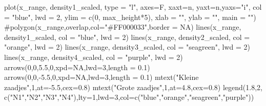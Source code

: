 \documentclass[
  a4paper,
]{scrbook}
\newenvironment{Shaded}{\begin{snugshade}}{\end{snugshade}}
\newcommand{\AttributeTok}[1]{\textcolor[rgb]{0.40,0.45,0.13}{#1}}
\newcommand{\CommentTok}[1]{\textcolor[rgb]{0.37,0.37,0.37}{#1}}
\newcommand{\ConstantTok}[1]{\textcolor[rgb]{0.56,0.35,0.01}{#1}}
\newcommand{\DecValTok}[1]{\textcolor[rgb]{0.68,0.00,0.00}{#1}}
\newcommand{\FloatTok}[1]{\textcolor[rgb]{0.68,0.00,0.00}{#1}}
\newcommand{\FunctionTok}[1]{\textcolor[rgb]{0.28,0.35,0.67}{#1}}
\newcommand{\NormalTok}[1]{\textcolor[rgb]{0.00,0.23,0.31}{#1}}
\newcommand{\SpecialCharTok}[1]{\textcolor[rgb]{0.37,0.37,0.37}{#1}}
\newcommand{\StringTok}[1]{\textcolor[rgb]{0.13,0.47,0.30}{#1}}
\theoremstyle{definition}
\theoremstyle{remark}
\begin{document}
\begin{Shaded}
\begin{Highlighting}[]
  \FunctionTok{plot}\NormalTok{(x\_range, density1\_scaled, }\AttributeTok{type =} \StringTok{"l"}\NormalTok{, }
       \AttributeTok{axes=}\NormalTok{F, }\AttributeTok{xaxt=}\StringTok{\textquotesingle{}n\textquotesingle{}}\NormalTok{, }\AttributeTok{yaxt=}\StringTok{\textquotesingle{}n\textquotesingle{}}\NormalTok{,}\AttributeTok{yaxs=}\StringTok{"i"}\NormalTok{,}
       \AttributeTok{col =} \StringTok{"blue"}\NormalTok{, }\AttributeTok{lwd =} \DecValTok{2}\NormalTok{, }\AttributeTok{ylim =} \FunctionTok{c}\NormalTok{(}\DecValTok{0}\NormalTok{, max\_height}\SpecialCharTok{*}\DecValTok{5}\NormalTok{), }
       \AttributeTok{xlab =} \StringTok{""}\NormalTok{, }\AttributeTok{ylab =} \StringTok{""}\NormalTok{, }\AttributeTok{main =} \StringTok{""}\NormalTok{)}
  \CommentTok{\#polygon(x\_range,overlap,col="\#FF000033",border = NA)}
  \FunctionTok{lines}\NormalTok{(x\_range, density1\_scaled, }\AttributeTok{col =} \StringTok{"blue"}\NormalTok{, }\AttributeTok{lwd =} \DecValTok{2}\NormalTok{)}
  \FunctionTok{lines}\NormalTok{(x\_range, density2\_scaled, }\AttributeTok{col =} \StringTok{"orange"}\NormalTok{, }\AttributeTok{lwd =} \DecValTok{2}\NormalTok{)}
  \FunctionTok{lines}\NormalTok{(x\_range, density3\_scaled, }\AttributeTok{col =} \StringTok{"seagreen"}\NormalTok{, }\AttributeTok{lwd =} \DecValTok{2}\NormalTok{)}
  \FunctionTok{lines}\NormalTok{(x\_range, density4\_scaled, }\AttributeTok{col =} \StringTok{"purple"}\NormalTok{, }\AttributeTok{lwd =} \DecValTok{2}\NormalTok{)}
  \FunctionTok{arrows}\NormalTok{(}\DecValTok{0}\NormalTok{,}\DecValTok{0}\NormalTok{,}\FloatTok{5.5}\NormalTok{,}\DecValTok{0}\NormalTok{,}\AttributeTok{xpd=}\ConstantTok{NA}\NormalTok{,}\AttributeTok{lwd=}\DecValTok{3}\NormalTok{,}\AttributeTok{length =} \FloatTok{0.1}\NormalTok{)}
  \FunctionTok{arrows}\NormalTok{(}\DecValTok{0}\NormalTok{,}\DecValTok{0}\NormalTok{,}\SpecialCharTok{{-}}\FloatTok{5.5}\NormalTok{,}\DecValTok{0}\NormalTok{,}\AttributeTok{xpd=}\ConstantTok{NA}\NormalTok{,}\AttributeTok{lwd=}\DecValTok{3}\NormalTok{,}\AttributeTok{length =} \FloatTok{0.1}\NormalTok{)}
  \FunctionTok{mtext}\NormalTok{(}\StringTok{"Kleine zaadjes"}\NormalTok{,}\DecValTok{1}\NormalTok{,}\AttributeTok{at=}\SpecialCharTok{{-}}\FloatTok{5.5}\NormalTok{,}\AttributeTok{cex=}\FloatTok{0.8}\NormalTok{)}
  \FunctionTok{mtext}\NormalTok{(}\StringTok{"Grote zaadjes"}\NormalTok{,}\DecValTok{1}\NormalTok{,}\AttributeTok{at=}\FloatTok{4.8}\NormalTok{,}\AttributeTok{cex=}\FloatTok{0.8}\NormalTok{)}
  \FunctionTok{legend}\NormalTok{(}\FloatTok{1.8}\NormalTok{,}\DecValTok{2}\NormalTok{, }\FunctionTok{c}\NormalTok{(}\StringTok{"N1"}\NormalTok{,}\StringTok{"N2"}\NormalTok{,}\StringTok{"N3"}\NormalTok{,}\StringTok{"N4"}\NormalTok{),}\AttributeTok{lty=}\DecValTok{1}\NormalTok{,}\AttributeTok{lwd=}\DecValTok{3}\NormalTok{,}\AttributeTok{col=}\FunctionTok{c}\NormalTok{(}\StringTok{"blue"}\NormalTok{,}\StringTok{"orange"}\NormalTok{,}\StringTok{"seagreen"}\NormalTok{,}\StringTok{"purple"}\NormalTok{))}
  

\end{Highlighting}
\end{Shaded}
\end{document}
